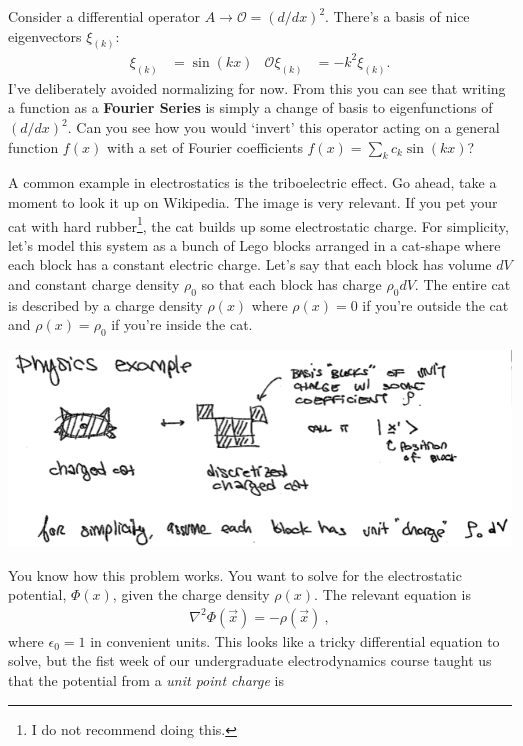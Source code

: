 \begin{example}
Consider a differential operator $A\to \mathcal O = (d/dx)^2$. There's a basis of nice eigenvectors $\xi_{(k)}$:
 \begin{align}
   \xi_{(k)} &= \sin (kx)
   &
   \mathcal O \xi_{(k)} &= -k^2 \xi_{(k)}. 
 \end{align}
 I've deliberately avoided normalizing for now. From this you can see that writing a function as a \textbf{Fourier Series} is simply a change of basis to eigenfunctions of $(d/dx)^2$. Can you see how you would `invert' this operator acting on a general function $f(x)$ with a set of Fourier coefficients $f(x) = \sum_k c_k\sin(kx)$?
\end{example} 


\begin{example}
A common example in electrostatics is the triboelectric effect. Go ahead, take a moment to look it up on Wikipedia. The image is very relevant. If you pet your cat with hard rubber\footnote{I do not recommend doing this.}, the cat builds up some electrostatic charge. For simplicity, let's model this system as a bunch of Lego blocks arranged in a cat-shape where each block has a constant electric charge. Let's say that each block has volume $dV$ and constant charge density $\rho_0$ so that each block has charge $\rho_0 dV$. The entire cat is described by a charge density $\rho(x)$ where $\rho(x)=0$ if you're outside the cat and $\rho(x)=\rho_0$ if you're inside the cat. 
\begin{center}
\includegraphics[width=.8\textwidth]{figures/lec06_cat.png}
\end{center}
You know how this problem works. You want to solve for the electrostatic potential, $\Phi(x)$, given the charge density $\rho(x)$. The relevant equation is
\begin{align}
  \nabla^2 \Phi(\vec{x}) = -\rho(\vec{x})\ ,
\end{align}
where $\epsilon_0=1$ in convenient units. This looks like a tricky differential equation to solve, but the fist week of our undergraduate electrodynamics course taught us that the potential from a \emph{unit point charge} is

\end{example}
